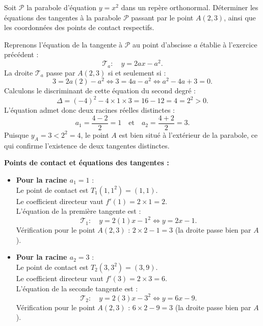 \documentclass[11pt,a4paper]{article}
\begin{document}
Soit $\mathcal{P}$ la parabole d'équation $y = x^2$ dans un repère orthonormal.
Déterminer les équations des tangentes à la parabole $\mathcal{P}$ passant par le point $A(2, 3)$, ainsi que les coordonnées des points de contact respectifs.

\begin{correctionbox}
Reprenons l'équation de la tangente à $\mathcal{P}$ au point d'abscisse $a$ établie à l'exercice précédent :
\[
\mathcal{T}_a : \quad y = 2ax - a^2.
\]
La droite $\mathcal{T}_a$ passe par $A(2, 3)$ si et seulement si :
\[
3 = 2a(2) - a^2 \iff 3 = 4a - a^2 \iff a^2 - 4a + 3 = 0.
\]
Calculons le discriminant de cette équation du second degré :
\[
\Delta = (-4)^2 - 4 \times 1 \times 3 = 16 - 12 = 4 = 2^2 > 0.
\]
L'équation admet donc deux racines réelles distinctes :
\[
a_1 = \frac{4 - 2}{2} = 1 \quad \text{et} \quad a_2 = \frac{4 + 2}{2} = 3.
\]
Puisque $y_A = 3 < 2^2 = 4$, le point $A$ est bien situé à l'extérieur de la parabole, ce qui confirme l'existence de deux tangentes distinctes.

\textbf{Points de contact et équations des tangentes :}
\begin{itemize}
    \item \textbf{Pour la racine $a_1 = 1$} :\\
    Le point de contact est $T_1(1, 1^2) = (1, 1)$.\\
    Le coefficient directeur vaut $f'(1) = 2 \times 1 = 2$.\\
    L'équation de la première tangente est :
    \[
    \mathcal{T}_1 : \quad y = 2(1)x - 1^2 \iff y = 2x - 1.
    \]
    Vérification pour le point $A(2, 3)$ : $2 \times 2 - 1 = 3$ (la droite passe bien par $A$).

    \item \textbf{Pour la racine $a_2 = 3$} :\\
    Le point de contact est $T_2(3, 3^2) = (3, 9)$.\\
    Le coefficient directeur vaut $f'(3) = 2 \times 3 = 6$.\\
    L'équation de la seconde tangente est :
    \[
    \mathcal{T}_2 : \quad y = 2(3)x - 3^2 \iff y = 6x - 9.
    \]
    Vérification pour le point $A(2, 3)$ : $6 \times 2 - 9 = 3$ (la droite passe bien par $A$).
\end{itemize}
\end{correctionbox}

\end{document}
